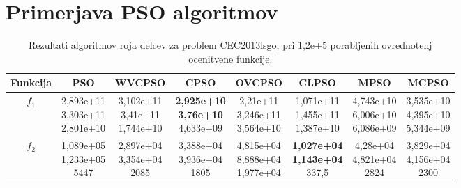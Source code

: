 
\section{Primerjava PSO algoritmov}

\begin{table}[t]
    \renewcommand{\arraystretch}{1.1}
    \centering
    \caption{Rezultati algoritmov roja delcev za problem CEC2013lsgo, pri 1,2e+5 porabljenih ovrednotenj ocenitvene funkcije.} \label{tab:bech:opt_one_stats}
    \begin{small}
    \begin{tabular}{|c|c|c|c|c|c|c|c|}
        \hline
        Funkcija & PSO & WVCPSO & CPSO & OVCPSO & CLPSO & MPSO & MCPSO \\\hline
        $f_1$    & \makecell{2,893e+11 \\ 3,303e+11 \\ 2,801e+10} & \makecell{3,102e+11 \\ 3,41e+11 \\ 1,744e+10}  & \makecell{\textbf{2,925e+10} \\ \textbf{3,76e+10} \\ 4,633e+09}  & \makecell{2,21e+11 \\ 3,246e+11 \\ 3,564e+10} & \makecell{1,071e+11 \\ 1,455e+11 \\ 1,387e+10} & \makecell{4,743e+10 \\ 6,006e+10 \\ 6,086e+09} & \makecell{3,535e+10 \\ 4,395e+10 \\ 5,344e+09} \\\hline
        $f_2$    & \makecell{1,089e+05 \\ 1,233e+05 \\ 5447}      & \makecell{2,897e+04 \\ 3,354e+04 \\ 2085}      & \makecell{3,388e+04 \\ 3,936e+04 \\ 1805}      & \makecell{4,815e+04 \\ 8,888e+04 \\ 1,977e+04} & \makecell{\textbf{1,027e+04} \\ \textbf{1,143e+04} \\ 337,5}     & \makecell{4,28e+04 \\ 4,821e+04 \\ 2824}       & \makecell{3,829e+04 \\ 4,156e+04 \\ 2300}      \\\hline

\end{tabular}
\end{small}
\end{table}
